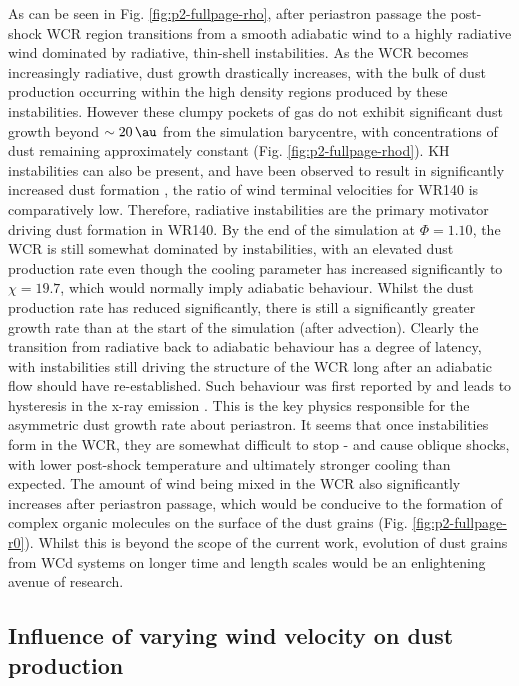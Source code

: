As can be seen in Fig. \ref{fig:p2-fullpage-rho}, after periastron passage the post-shock WCR region transitions from a smooth adiabatic wind to a highly radiative wind dominated by radiative, thin-shell instabilities.
As the WCR becomes increasingly radiative, dust growth drastically increases, with the bulk of dust production occurring within the high density regions produced by these instabilities.
However these clumpy pockets of gas do not exhibit significant dust growth beyond $\sim \SI{20}{\au}$ from the simulation barycentre, with concentrations of dust remaining approximately constant (Fig. \ref{fig:p2-fullpage-rhod}).
KH instabilities can also be present, and have been observed to result in significantly increased dust formation \parencite{eatsonExplorationDustGrain2022}, the ratio of wind terminal velocities for WR140 is comparatively low.
Therefore, radiative instabilities are the primary motivator driving dust formation in WR140.
By the end of the simulation at $\Phi = 1.10$, the WCR is still somewhat dominated by instabilities, with an elevated dust production rate even though the cooling parameter has increased significantly to $\chi = 19.7$, which would normally imply adiabatic behaviour.
Whilst the dust production rate has reduced significantly, there is still a significantly greater growth rate than at the start of the simulation (after advection).
Clearly the transition from radiative back to adiabatic behaviour has a degree of latency, with instabilities still driving the structure of the WCR long after an adiabatic flow should have re-established.
Such behaviour was first reported by \textcite{pittard_3d_2009} and leads to hysteresis in the x-ray emission \parencite{pittard_3d_2010}.
This is the key physics responsible for the asymmetric dust growth rate about periastron.
It seems that once instabilities form in the WCR, they are somewhat difficult to stop - and cause oblique shocks, with lower post-shock temperature and ultimately stronger cooling than expected.
The amount of wind being mixed in the WCR also significantly increases after periastron passage, which would be conducive to the formation of complex organic molecules on the surface of the dust grains (Fig. \ref{fig:p2-fullpage-r0}).
Whilst this is beyond the scope of the current work, evolution of dust grains from WCd systems on longer time and length scales would be an enlightening avenue of research.

\subsection{Influence of varying wind velocity on dust production}

